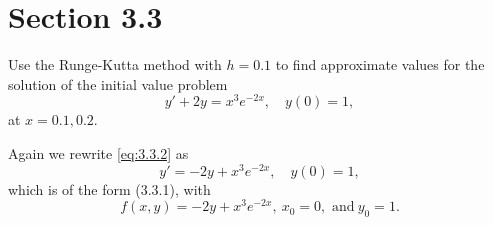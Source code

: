 \section*{Section 3.3}
\setcounter{chapter}{3}
\setcounter{section}{3}

\setcounter{example}{0}
\setcounter{equation}{1}
\begin{example}
  \label{example:3.3.1} \rm Use the Runge-Kutta method with $h=0.1$ to find approximate values for
  the solution of the initial value problem
  \begin{equation}
    \label{eq:3.3.2}y'+2y=x^{3}e^{-2x},\quad y(0)=1,
  \end{equation}
  at $x=0.1,0.2$.
\end{example}
\begin{examplesolution}
\solution Again we rewrite \eqref{eq:3.3.2} as
\[
  y'=-2y+x^{3}e^{-2x},\quad y(0)=1,
\]
which is of the form \textup{(3.3.1)}, with
\[
  f(x,y)=-2y+x^{3}e^{-2x},\ x_{0}=0,\mbox{\ and}\ y_{0}=1.
\]


\end{examplesolution}
